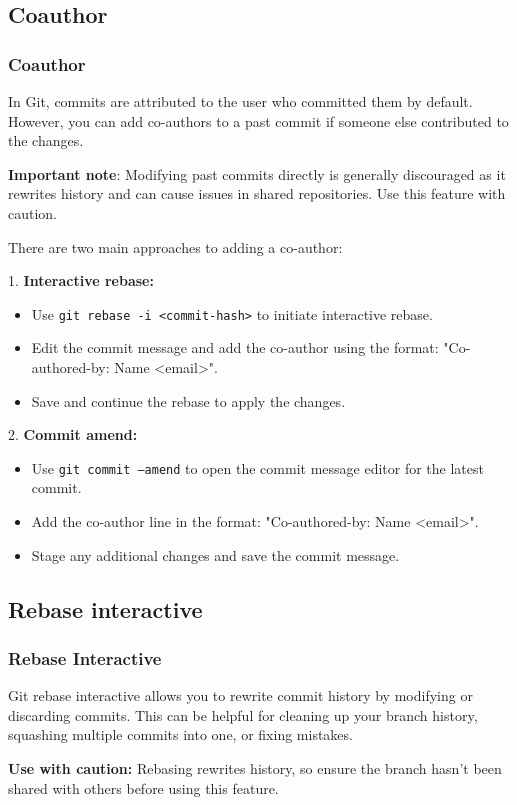 \documentclass{beamer}
\begin{document}
    \subsection{Coauthor}\label{subsec:coauthor}
    \begin{frame}
        \frametitle{Coauthor}
        In Git, commits are attributed to the user who committed them by default. However, you can add co-authors to a past commit if someone else contributed to the changes.

        \textbf{Important note}: Modifying past commits directly is generally discouraged as it rewrites history and can cause issues in shared repositories. Use this feature with caution.
    \end{frame}

    \begin{frame}
        There are two main approaches to adding a co-author:

        1. \textbf{Interactive rebase:}
            \begin{itemize}
                \item Use \texttt{git rebase -i <commit-hash>} to initiate interactive rebase.
                \item Edit the commit message and add the co-author using the format: "Co-authored-by: Name <email>".
                \item Save and continue the rebase to apply the changes.
            \end{itemize}

        2. \textbf{Commit amend:}
            \begin{itemize}
                \item Use \texttt{git commit --amend} to open the commit message editor for the latest commit.
                \item Add the co-author line in the format: "Co-authored-by: Name <email>".
                \item Stage any additional changes and save the commit message.
            \end{itemize}
    \end{frame}

    \subsection{Rebase interactive}\label{subsec:rebase-interactive}

    \begin{frame}
        \frametitle{Rebase Interactive}
        Git rebase interactive allows you to rewrite commit history by modifying or discarding commits. This can be helpful for cleaning up your branch history, squashing multiple commits into one, or fixing mistakes.

        \textbf{Use with caution:} Rebasing rewrites history, so ensure the branch hasn't been shared with others before using this feature.
    \end{frame}
\end{document}
